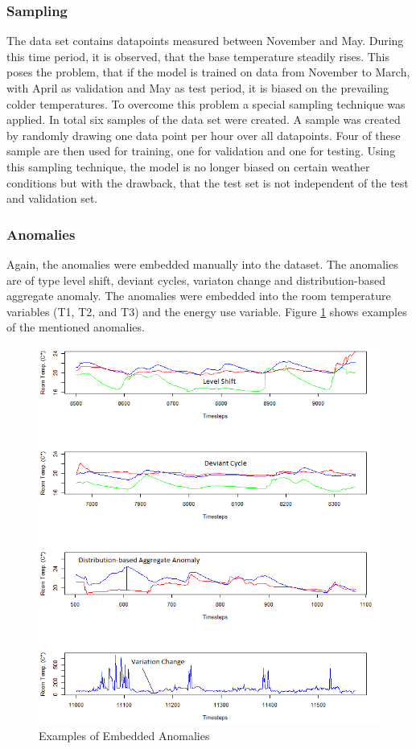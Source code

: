 \subsubsection{Sampling}
The data set contains datapoints measured between November and May. During this time period, it is observed, that the base temperature steadily rises. This poses the problem, that if the model is trained on data from November to March, with April as validation and May as test period, it is biased on the prevailing colder temperatures. To overcome this problem a special sampling technique was applied. In total six samples of the data set were created. A sample was created by randomly drawing one data point per hour over all datapoints. Four of these sample are then used for training, one for validation and one for testing. Using this sampling technique, the model is no longer biased on certain weather conditions but with the drawback, that the test set is not independent of the test and validation set.   

\subsubsection{Anomalies}
Again, the anomalies were embedded manually into the dataset. The anomalies are of type level shift, deviant cycles, variaton change and distribution-based aggregate anomaly. The anomalies were embedded into the room temperature variables (T1, T2, and T3) and the energy use variable. Figure \ref{fig:temp_anomalies} shows examples of the mentioned anomalies.

\begin{figure}[h]
	\centering
	\includegraphics[scale=0.7]{Figures/temp_anomalies}
	\decoRule
	\caption[Temperature Dataset Anomalies]{Examples of Embedded Anomalies \parencite{Own}}
	\label{fig:temp_anomalies}
\end{figure}

